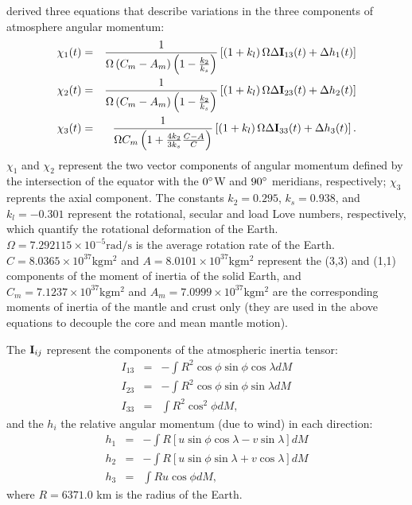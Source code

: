 
\citet{barnesetal1983} derived three equations that describe variations in the three components of atmosphere angular momentum:  
\begin{eqnarray}
{\bf \chi}_{1}(t) &=& \frac{1}{\Omega \left( C_m-A_m \right)\left(1-\frac{k_2}{k_s}  \right)}
\left[ \left(1+k_l \right) \Omega \Delta {\bf I}_{13}(t) + \Delta h_1(t)  \right] \label{eq:X1} \\
{\bf \chi}_{2}(t) &=& \frac{1}{\Omega \left( C_m-A_m \right)\left(1-\frac{k_2}{k_s}  \right)}
\left[ \left(1+k_l \right) \Omega \Delta {\bf I}_{23}(t) + \Delta h_2(t)  \right] \label{eq:X2} \\
{\bf \chi}_{3}(t) &=& \frac{1}{\Omega C_m \left(1+\frac{4k_2}{3k_s}\frac{C-A}{C} \right)}
\left[ \left(1+k_l \right) \Omega \Delta {\bf I}_{33}(t) + \Delta h_{3}(t) \label{eq:X3} \right].
\end{eqnarray}
%
$\chi_1$ and $\chi_2$ represent the two vector components of angular momentum defined by the intersection of the equator with the $0^\circ$W and $90^\circ$ meridians, respectively; $\chi_3$ reprents the axial component.
%
The constants 
$k_2 = 0.295$, 
$k_s = 0.938$, and 
$k_l = -0.301$
represent the rotational, secular and load Love numbers, respectively, which quantify the rotational deformation of the Earth.
$\Omega = 7.292115\times 10^{-5} \text{rad}/\text{s}$ is the average rotation rate  of the Earth. 
$C = 8.0365 \times 10^{37} \text{kg} \text{m}^2$ and $A = 8.0101 \times 10^{37} \text{kg} \text{m}^2$ represent the (3,3) and (1,1) components of the moment of inertia of the solid Earth, and $C_m = 7.1237\times 10^{37}  \text{kg} \text{m}^2$ and $A_m = 7.0999\times 10^{37} \text{kg} \text{m}^2$ are the corresponding moments of inertia of the mantle and crust only (they are used in the above equations to decouple the core and mean mantle motion).  



The ${\bf I}_{ij}$ represent the components of the atmospheric inertia tensor:
\begin{eqnarray}
  I_{13} &=& -\int R^2 \cos \phi \sin \phi \cos \lambda dM 
  \label{eq:I1}\\
  I_{23} &=& -\int R^2 \cos \phi \sin \phi \sin \lambda dM 
  \label{eq:I2}\\
  I_{33} &=&  \int R^2 \cos^2 \phi dM ,
  \label{eq:I3}
\end{eqnarray}
and the $h_i$ the relative angular momentum (due to wind) in each direction:
\begin{eqnarray}
  h_{1}  &=& -\int R \left[u \sin \phi \cos \lambda - v \sin \lambda \right] dM 
    \label{eq:h1}\\
  h_{2}  &=& -\int R \left[u \sin \phi \sin \lambda + v \cos \lambda \right] dM 
    \label{eq:h2}\\
  h_{3}  &=&  \int R u \cos \phi dM,
    \label{eq:h3}
\end{eqnarray}
%
where $R = 6371.0$ km is the radius of the Earth.

